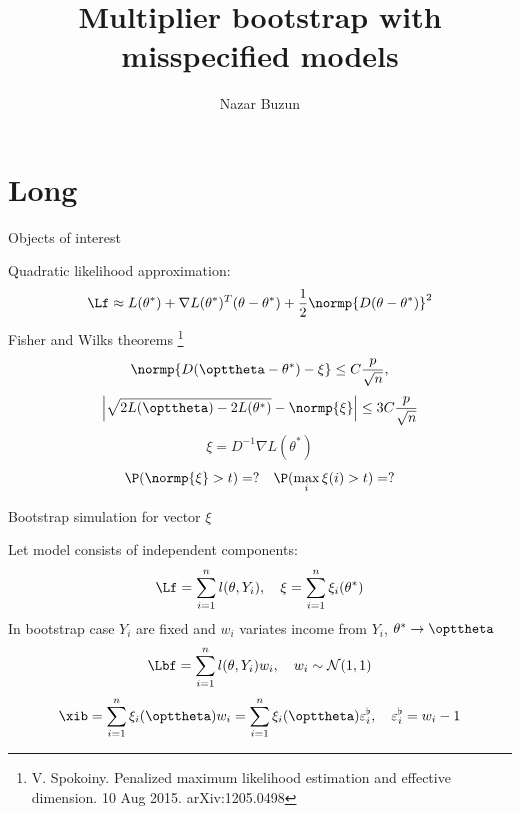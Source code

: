 \documentclass[9pt,english]{beamer}   %
\begin{document}
\title{Multiplier bootstrap with misspecified models}
\author{Nazar Buzun}
\date{}

\titlepage     %

\section[Short]{Long}
\begin{frame}{Objects of interest}

Quadratic likelihood approximation:
\[
\Lf \approx L(\theta^*) + \nabla L(\theta^*)^T (\theta - \theta^*) + \frac{1}{2} \normp{D(\theta - \theta^*)}^2
\]
Fisher and Wilks  theorems \footnote{V. Spokoiny. Penalized maximum likelihood estimation and effective dimension. 10 Aug 2015. 	arXiv:1205.0498}
\[
\normp{ D (\opttheta - \theta^*) - \xi } \leq  C \frac{p}{\sqrt{n}},
\]
\[
\left | \sqrt{ 2 L(\opttheta) - 2 L(\theta^*) }  - \normp{\xi}  \right | \leq  3 C \frac{p}{\sqrt{n}}
\]
\[
\xi = D^{-1} \nabla L(\theta^*) 
\]
\[
\P(\normp{\xi} > t) = ?
\quad
\P(\max_i{\xi(i)} > t) = ?
\]
\end{frame}

\begin{frame}{Bootstrap simulation for vector $\xi$}

Let model consists of independent components:
\[
\Lf = \sum_{i=1}^n  l(\theta, Y_i),
\quad
\xi = \sum_{i=1}^n \xi_i(\theta^*)
\]
In bootstrap case $Y_i$ 	are fixed and $w_i$ variates income from $Y_i$, $\theta^* \to \opttheta$
\[
\Lbf = \sum_{i=1}^n  l(\theta, Y_i) w_i, 
\quad w_i \sim \mathcal{N}(1,1)
\]
\[
\xib = \sum_{i=1}^n  \xi_i(\opttheta) w_i = \sum_{i=1}^n  \xi_i(\opttheta) \varepsilon_i^{\flat}  ,  
\quad \varepsilon_i^{\flat} =  w_i - 1 
\]
\end{frame}
\end{document}
